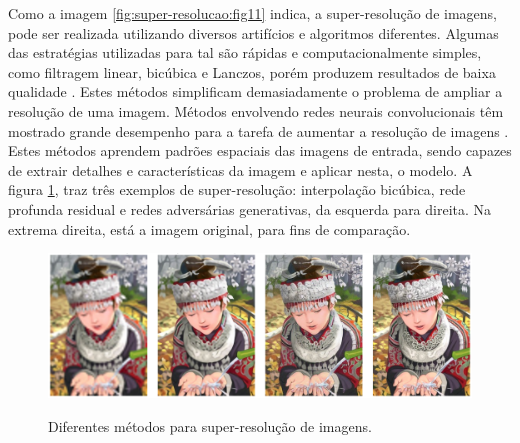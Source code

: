 Como a imagem \ref{fig:super-resolucao:fig11} indica, a super-resolução de imagens, pode ser realizada utilizando diversos artifícios e algoritmos diferentes. Algumas das estratégias utilizadas para tal são rápidas e computacionalmente simples, como filtragem linear, bicúbica e Lanczos, porém produzem resultados de baixa qualidade \cite{ledig_photo-realistic_2016}. Estes métodos simplificam demasiadamente o problema de ampliar a resolução de uma imagem. Métodos envolvendo redes neurais convolucionais têm mostrado grande desempenho para a tarefa de aumentar a resolução de imagens \cite{ledig_photo-realistic_2016, dong_image_2015}. Estes métodos aprendem padrões espaciais das imagens de entrada, sendo capazes de extrair detalhes e características da imagem e aplicar nesta, o modelo. A figura \ref{fig:super-resolucao:fig14}, traz três exemplos de super-resolução: interpolação bicúbica, rede profunda residual e redes adversárias generativas, da esquerda para direita. Na extrema direita, está a imagem original, para fins de comparação.

\begin{figure}[H]
    \centering
    \caption{Diferentes métodos para super-resolução de imagens.}
    \includegraphics[width=12cm]{fig/SISR.png}
    \label{fig:super-resolucao:fig14}
\end{figure}
